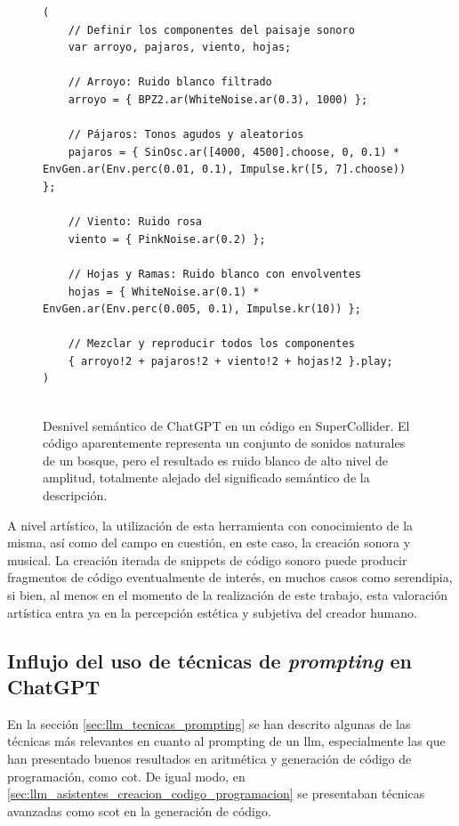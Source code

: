 \begin{figure}[H]
    \caption[Desnivel semántico de ChatGPT en un código en SuperCollider]{Desnivel semántico de ChatGPT en un código en SuperCollider. El código aparentemente representa un conjunto de sonidos naturales de un bosque, pero el resultado es ruido blanco de alto nivel de amplitud, totalmente alejado del significado semántico de la descripción.}
    \centering
    \begin{lstlisting}[style=SuperCollider-IDE, basicstyle=\footnotesize\ttfamily, numbers=none]
(
    // Definir los componentes del paisaje sonoro
    var arroyo, pajaros, viento, hojas;
    
    // Arroyo: Ruido blanco filtrado
    arroyo = { BPZ2.ar(WhiteNoise.ar(0.3), 1000) };
    
    // Pájaros: Tonos agudos y aleatorios
    pajaros = { SinOsc.ar([4000, 4500].choose, 0, 0.1) * EnvGen.ar(Env.perc(0.01, 0.1), Impulse.kr([5, 7].choose)) };
    
    // Viento: Ruido rosa
    viento = { PinkNoise.ar(0.2) };
    
    // Hojas y Ramas: Ruido blanco con envolventes
    hojas = { WhiteNoise.ar(0.1) * EnvGen.ar(Env.perc(0.005, 0.1), Impulse.kr(10)) };
    
    // Mezclar y reproducir todos los componentes
    { arroyo!2 + pajaros!2 + viento!2 + hojas!2 }.play;
)
            
    \end{lstlisting}
    \source{\propio}
    \label{fig:ChatGPT_desnivel_semantico}
\end{figure}

A nivel artístico, la utilización de esta herramienta con conocimiento de la misma, así como del campo en cuestión, en este caso, la creación sonora y musical. La creación iterada de snippets de código sonoro puede producir fragmentos de código eventualmente de interés, en muchos casos como serendipia, si bien, al menos en el momento de la realización de este trabajo, esta valoración artística entra ya en la percepción estética y subjetiva del creador humano.


\subsection{Influjo del uso de técnicas de \textit{prompting} en ChatGPT}

En la sección \ref{sec:llm_tecnicas_prompting} se han descrito algunas de las técnicas más relevantes en cuanto al prompting de un \gls{llm}, especialmente las que han presentado buenos resultados en aritmética y generación de código de programación, como \gls{cot}. De igual modo, en \ref{sec:llm_asistentes_creacion_codigo_programacion} se presentaban técnicas avanzadas como \gls{scot} en la generación de código.

